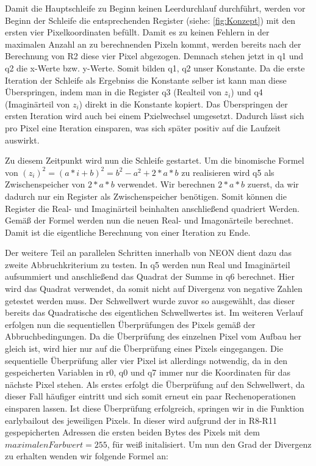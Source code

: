 \documentclass[11pt]{scrartcl}
\begin{document}
Damit die Hauptschleife zu Beginn keinen Leerdurchlauf durchführt, werden vor Beginn der Schleife die entsprechenden Register (siehe: \autoref{fig:Konzept}) mit den ersten vier Pixelkoordinaten befüllt.
Damit es zu keinen Fehlern in der maximalen Anzahl an zu berechnenden Pixeln kommt, werden bereits nach der Berechnung von R2 diese vier Pixel abgezogen.
Demnach stehen jetzt in q1 und q2 die x-Werte bzw. y-Werte. Somit bilden q1, q2 unser Konstante. Da die erste Iteration der Schleife als Ergebniss die Konstante selber ist kann man diese Überspringen, indem man in die Register q3 (Realteil von $z_i$) und q4 (Imaginärteil von $z_i$) direkt in die Konstante kopiert.
Das Überspringen der ersten Iteration wird auch bei einem Pxielwechsel umgesetzt. Dadurch lässt sich pro Pixel eine Iteration einsparen, was sich später positiv auf die Laufzeit auswirkt.


Zu diesem Zeitpunkt wird nun die Schleife gestartet.
Um die binomische Formel von $(z_i)^2 = (a*i+b)^2= b^2 - a^2 + 2*a*b$ zu realisieren wird q5 als Zwischenspeicher von $2*a*b$ verwendet.
Wir berechnen $2*a*b$ zuerst, da wir dadurch nur ein Register als Zwischenspeicher benötigen.
Somit können die Register die Real- und Imaginärteil beinhalten anschließend quadriert Werden. Gemäß der Formel werden nun die neuen Real- und Imagonärteile berechnet.
Damit ist die eigentliche Berechnung von einer Iteration zu Ende.


Der weitere Teil an parallelen Schritten innerhalb von NEON dient dazu das zweite Abbruchkriterium zu testen.
In q5 werden nun Real und Imaginärteil aufsummiert und anschließend das Quadrat der Summe in q6 berechnet.
Hier wird das Quadrat verwendet, da somit nicht auf Divergenz von negative Zahlen getestet werden muss. Der Schwellwert wurde zuvor so ausgewählt, das dieser bereits das Quadratische des eigentlichen Schwellwertes ist.
Im weiteren Verlauf erfolgen nun die sequentiellen Überprüfungen des Pixels gemäß der Abbruchbedingungen.
Da die Überprüfung des einzelnen Pixel vom Aufbau her gleich ist, wird hier nur auf die Überprüfung eines Pixels eingegangen.
Die sequentielle Überprüfung aller vier Pixel ist allerdings notwendig, da in den gespeicherten Variablen in r0, q0 und q7 immer nur die Koordinaten für das nächste Pixel stehen.
Als erstes erfolgt die Überprüfung auf den Schwellwert, da dieser Fall häufiger eintritt und sich somit erneut ein paar Rechenoperationen einsparen lassen.
Ist diese Überprüfung erfolgreich, springen wir in die Funktion earlybailout des jeweiligen Pixels.
In dieser wird aufgrund der in R8-R11 gespepicherten Adressen die ersten beiden Bytes des Pixels mit dem $maximalenFarbwert=255$, für weiß initalisiert.
Um nun den Grad der Divergenz zu erhalten wenden wir folgende Formel an:
\end{document}
